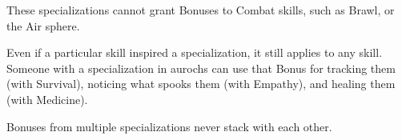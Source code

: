 \begin{multicols}{2}
These specializations cannot grant Bonuses to Combat \glspl{skill}, such as Brawl, or the Air \gls{sphere}.

Even if a particular skill inspired a specialization, it still applies to any skill.
Someone with a specialization in aurochs can use that Bonus for tracking them (with Survival), noticing what spooks them (with Empathy), and healing them (with Medicine).

Bonuses from multiple specializations never stack with each other.

\end{multicols}

